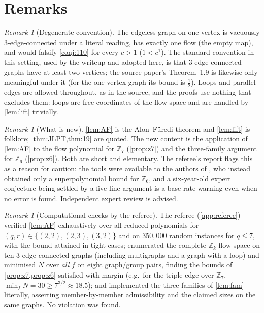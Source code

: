 \documentclass[11pt,a4paper]{article}
\theoremstyle{plain}
\theoremstyle{definition}
\theoremstyle{remark}
\newtheorem{remark}[theorem]{Remark}
\newcommand{\Z}{{\mathbb Z}}
\newcommand{\Nf}{N}
\begin{document}
\section{Remarks}\label{sec:remarks}

\begin{remark}[Degenerate convention]\label{rem:degenerate}
The edgeless graph on one vertex is vacuously $3$-edge-connected under a literal reading, has exactly one flow (the empty map), and would falsify \cref{conj:110} for every $c>1$ ($1<c^1$). The standard convention in this setting, used by the writeup and adopted here, is that $3$-edge-connected graphs have at least two vertices; the source paper's Theorem~1.9 is likewise only meaningful under it (for the one-vertex graph its bound is $\frac12$). Loops and parallel edges are allowed throughout, as in the source, and the proofs use nothing that excludes them: loops are free coordinates of the flow space and are handled by \cref{lem:lift} trivially.
\end{remark}

\begin{remark}[What is new]
\cref{lem:AF} is the Alon--Füredi theorem and \cref{lem:lift} is folklore; \cref{thm:JLPT,thm:19} are quoted. The new content is the application of \cref{lem:AF} to the flow polynomial for $\Z_7$ (\cref{prop:z7}) and the three-family argument for $\Z_6$ (\cref{prop:z6}). Both are short and elementary. The referee's report flags this as a reason for caution: the tools were available to the authors of \cite{DLMS20}, who instead obtained only a superpolynomial bound for $\Z_6$, and a six-year-old expert conjecture being settled by a five-line argument is a base-rate warning even when no error is found. Independent expert review is advised.
\end{remark}

\begin{remark}[Computational checks by the referee]
The referee (\cref{app:referee}) verified \cref{lem:AF} exhaustively over all reduced polynomials for $(q,r)\in\{(2,2),(2,3),(3,2)\}$ and on $350{,}000$ random instances for $q\le7$, with the bound attained in tight cases; enumerated the complete $\Z_k$-flow space on ten $3$-edge-connected graphs (including multigraphs and a graph with a loop) and minimised $\Nf$ over \emph{all} $f$ on eight graph/group pairs, finding the bounds of \cref{prop:z7,prop:z6} satisfied with margin (e.g.\ for the triple edge over $\Z_7$, $\min_f\Nf=30\ge7^{3/2}\approx18.5$); and implemented the three families of \cref{lem:fam} literally, asserting member-by-member admissibility and the claimed sizes on the same graphs. No violation was found.
\end{remark}
\end{document}
